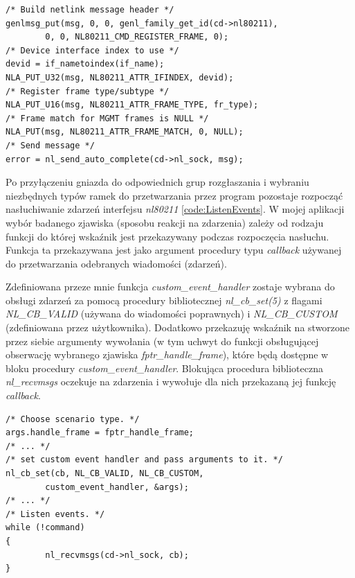 \begin{lstlisting}[frame=tb]
/* Build netlink message header */
genlmsg_put(msg, 0, 0, genl_family_get_id(cd->nl80211), 
        0, 0, NL80211_CMD_REGISTER_FRAME, 0);
/* Device interface index to use */
devid = if_nametoindex(if_name);
NLA_PUT_U32(msg, NL80211_ATTR_IFINDEX, devid);
/* Register frame type/subtype */
NLA_PUT_U16(msg, NL80211_ATTR_FRAME_TYPE, fr_type);
/* Frame match for MGMT frames is NULL */
NLA_PUT(msg, NL80211_ATTR_FRAME_MATCH, 0, NULL);       
/* Send message */
error = nl_send_auto_complete(cd->nl_sock, msg);
\end{lstlisting}

Po przyłączeniu gniazda do odpowiednich grup rozgłaszania i wybraniu niezbędnych typów ramek do przetwarzania przez program pozostaje rozpocząć nasłuchiwanie zdarzeń interfejsu \emph{nl80211} \ref{code:ListenEvents}. W mojej aplikacji wybór badanego zjawiska (sposobu reakcji na zdarzenia) zależy od rodzaju funkcji do której wskaźnik jest przekazywany podczas rozpoczęcia nasłuchu. Funkcja ta przekazywana jest jako argument procedury typu \emph{callback} używanej do przetwarzania odebranych wiadomości (zdarzeń). 

Zdefiniowana przeze mnie funkcja \emph{custom\_event\_handler} zostaje wybrana do obsługi zdarzeń za pomocą procedury bibliotecznej \emph{nl\_cb\_set(5)} z flagami \emph{NL\_CB\_VALID} (używana do wiadomości poprawnych) i \emph{NL\_CB\_CUSTOM} (zdefiniowana przez użytkownika). Dodatkowo przekazuję wskaźnik na stworzone przez siebie argumenty wywołania (w tym uchwyt do funkcji obsługującej obserwację wybranego zjawiska \emph{fptr\_handle\_frame}), które będą dostępne w bloku procedury \emph{custom\_event\_handler}. Blokująca procedura biblioteczna \emph{nl\_recvmsgs} oczekuje na zdarzenia i wywołuje dla nich przekazaną jej funkcję \emph{callback}. 

\begin{lstlisting}[frame=tb]
/* Choose scenario type. */
args.handle_frame = fptr_handle_frame;
/* ... */
/* set custom event handler and pass arguments to it. */
nl_cb_set(cb, NL_CB_VALID, NL_CB_CUSTOM,
        custom_event_handler, &args);
/* ... */
/* Listen events. */
while (!command)
{
        nl_recvmsgs(cd->nl_sock, cb);
}
\end{lstlisting}

